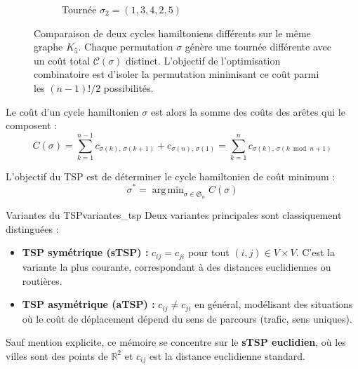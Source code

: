 \documentclass[12pt, a4paper, twoside, openright]{book}
\newcommand{\R}{\mathbb{R}}
\DeclareMathOperator*{\argmin}{arg\,min}
\begin{document}
\begin{figure}[H]
\begin{subfigure}[b]{0.48\textwidth}
			\caption{Tournée $\sigma_2 = (1, 3, 4, 2, 5)$}
		\end{subfigure}
		\caption{Comparaison de deux cycles hamiltoniens différents sur le même graphe $K_5$. Chaque permutation $\sigma$ génère une tournée différente avec un coût total $\mathcal{C}(\sigma)$ distinct. L'objectif de l'optimisation combinatoire est d'isoler la permutation minimisant ce coût parmi les $(n-1)!/2$ possibilités.}	
		\label{fig:comparaison_cycles_hamiltoniens}
	\end{figure}
	
	Le coût d'un cycle hamiltonien $\sigma$ est alors la somme des coûts des
	arêtes qui le composent :
	$$
	C(\sigma) = \sum_{k=1}^{n-1} c_{\sigma(k),\,\sigma(k+1)}
	+ c_{\sigma(n),\,\sigma(1)}
	= \sum_{k=1}^{n} c_{\sigma(k),\,\sigma(k \bmod n + 1)}
	$$
	
	L'objectif du TSP est de déterminer le cycle hamiltonien de coût minimum :
	$$
	\sigma^* = \argmin_{\sigma \in \mathfrak{S}_n} C(\sigma)
	$$
	
	\begin{remark}{Variantes du TSP}{variantes_tsp}
		Deux variantes principales sont classiquement distinguées :
		\begin{itemize}
			\item \textbf{TSP symétrique (sTSP) :} $c_{ij} = c_{ji}$ pour tout
			$(i,j) \in V \times V$. C'est la variante la plus courante,
			correspondant à des distances euclidiennes ou routières.
			\item \textbf{TSP asymétrique (aTSP) :} $c_{ij} \neq c_{ji}$ en
			général, modélisant des situations où le coût de déplacement
			dépend du sens de parcours (trafic, sens uniques).
		\end{itemize}
		Sauf mention explicite, ce mémoire se concentre sur le \textbf{sTSP
			euclidien}, où les villes sont des points de $\R^2$ et $c_{ij}$ est la
		distance euclidienne standard.
	\end{remark}
	
\end{document}
